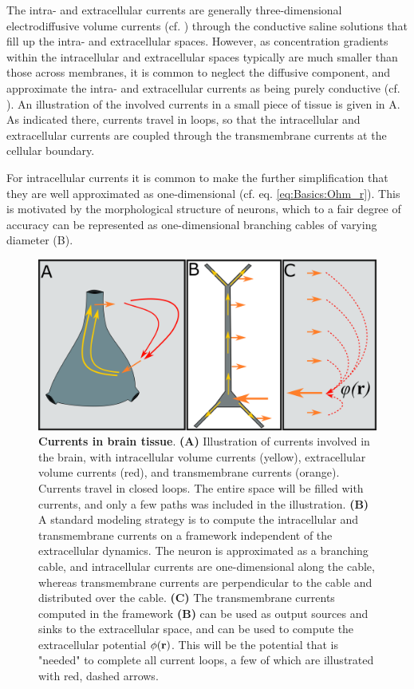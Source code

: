 The intra- and extracellular currents are generally three-dimensional electrodiffusive volume currents (cf. ) through the conductive saline solutions that fill up the intra- and extracellular spaces. However, as concentration gradients within the intracellular and extracellular spaces typically are much smaller than those across membranes, it is common to neglect the diffusive component, and approximate the intra- and extracellular currents as being purely conductive (cf. ). An illustration of the involved currents in a small piece of tissue is given in A. As indicated there, currents travel in loops, so that the intracellular and extracellular currents are coupled through the transmembrane currents at the cellular boundary. 

For intracellular currents it is common to make the further simplification that they are well approximated as one-dimensional (cf. eq. \ref{eq:Basics:Ohm_r}). This is motivated by the morphological structure of neurons, which to a fair degree of accuracy can be represented as one-dimensional branching cables of varying diameter (B).

\begin{figure}[!ht]
\begin{center}
\includegraphics[width=1.0\textwidth]{Figures/Basics/Twostep.png}
\end{center}
\caption{{\bf Currents in brain tissue}. {\bf(A)} Illustration of currents involved in the brain, with intracellular volume currents (yellow), extracellular volume currents (red), and transmembrane currents (orange). Currents travel in closed loops. The entire space will be filled with currents, and only a few paths was included in the illustration. {\bf(B)} A standard modeling strategy is to compute the intracellular and transmembrane currents on a framework independent of the extracellular dynamics. The neuron is approximated as a branching cable, and intracellular currents are one-dimensional along the cable, whereas transmembrane currents are perpendicular to the cable and distributed over the cable. {\bf(C)} The transmembrane currents computed in the framework {\bf(B)} can be used as output sources and sinks to the extracellular space, and can be used to compute the extracellular potential $\phi({\bf r})$. This will be the potential that is "needed" to complete all current loops, a few of which are illustrated with red, dashed arrows.
}
\label{fig:Basics:Twostep}
\end{figure}



